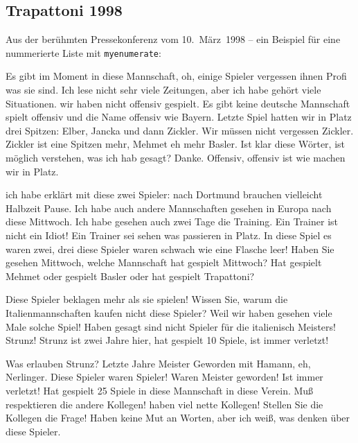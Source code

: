 \subsection{Trapattoni 1998}\label{subsec:trapattoni}
Aus der berühmten Pressekonferenz vom 10.~März~1998 -- ein Beispiel für eine nummerierte Liste mit \verb|myenumerate|:
%
\begin{myenumerate}
\item
Es gibt im Moment in diese Mannschaft, oh, einige Spieler vergessen ihnen Profi was sie sind. 
Ich lese nicht sehr viele Zeitungen, aber ich habe gehört viele Situationen. 
wir haben nicht offensiv gespielt. 
Es gibt keine deutsche Mannschaft spielt offensiv und die Name offensiv wie Bayern. 
Letzte Spiel hatten wir in Platz drei Spitzen: Elber, Jancka und dann Zickler. 
Wir müssen nicht vergessen Zickler. 
Zickler ist eine Spitzen mehr, Mehmet eh mehr Basler. 
Ist klar diese Wörter, ist möglich verstehen, was ich hab gesagt? Danke. 
Offensiv, offensiv ist wie machen wir in Platz. 

\item
ich habe erklärt mit diese zwei Spieler: nach Dortmund brauchen vielleicht Halbzeit Pause. Ich habe auch andere Mannschaften gesehen in Europa nach diese Mittwoch. Ich habe gesehen auch zwei Tage die Training. Ein Trainer ist nicht ein Idiot! Ein Trainer sei sehen was passieren in Platz. In diese Spiel es waren zwei, drei diese Spieler waren schwach wie eine Flasche leer! Haben Sie gesehen Mittwoch, welche Mannschaft hat gespielt Mittwoch? Hat gespielt Mehmet oder gespielt Basler oder hat gespielt Trapattoni? 

\item
Diese Spieler beklagen mehr als sie spielen! 
Wissen Sie, warum die Italienmannschaften kaufen nicht diese Spieler? 
Weil wir haben gesehen viele Male solche Spiel! 
Haben gesagt sind nicht Spieler für die italienisch Meisters! Strunz! 
Strunz ist zwei Jahre hier, hat gespielt 10 Spiele, ist immer verletzt! 

\item
Was erlauben Strunz? Letzte Jahre Meister Geworden mit Hamann, eh, Nerlinger. 
Diese Spieler waren Spieler! Waren Meister geworden! Ist immer verletzt! 
Hat gespielt 25 Spiele in diese Mannschaft in diese Verein. 
Muß respektieren die andere Kollegen! haben viel nette Kollegen! 
Stellen Sie die Kollegen die Frage!
Haben keine Mut an Worten, aber ich weiß, was denken über diese Spieler. 

\end{myenumerate}

